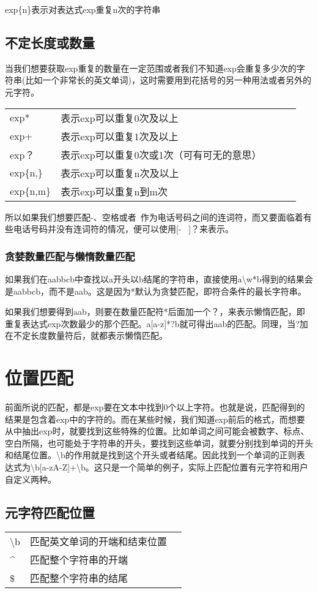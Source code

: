 \documentclass[a4papaer,utf8,12pt,draft,titlepage]{ctexart}
\begin{document}
				exp\{n\}表示对表达式exp重复n次的字符串
			\subsection{不定长度或数量}
				当我们想要获取exp重复的数量在一定范围或者我们不知道exp会重复多少次的字符串(比如一个非常长的英文单词)，这时需要用到花括号的另一种用法或者另外的元字符。
				
					\begin{table}[h]
					\begin{tabular}{lllll}
						exp* & 表示exp可以重复0次及以上&  &  &  \\
						exp+ & 表示exp可以重复1次及以上          &  &  &  \\
						exp？& 表示exp可以重复0次或1次（可有可无的意思）           &  &  &  \\
						exp\{n,\}               & 表示exp可以重复n次及以上  &  &  &\\
						exp\{n,m\} &表示exp可以重复n到m次 
					\end{tabular}
				\end{table}
				所以如果我们想要匹配-、空格或者~作为电话号码之间的连词符，而又要面临着有些电话号码并没有连词符的情况，便可以使用[- ~]？来表示。
				\subsubsection{贪婪数量匹配与懒惰数量匹配}
					如果我们在aabbcb中查找以a开头以b结尾的字符串，直接使用a\textbackslash{}w*b得到的结果会是aabbcb，而不是aab。这是因为*默认为贪婪匹配，即符合条件的最长字符串。
					
					如果我们想要得到aab，则要在数量匹配符*后面加一个？，来表示懒惰匹配，即重复表达式exp次数最少的那个匹配。a[a-z]*?b就可得出aab的匹配。同理，当?加在不定长度数量符后，就都表示懒惰匹配。
		\section{位置匹配}
			前面所说的匹配，都是exp要在文本中找到0个以上字符。也就是说，匹配得到的结果是包含着exp中的字符的。而在某些时候，我们知道exp前后的格式，而想要从中抽出exp时，就要找到这些特殊的位置。比如单词之间可能会被数字、标点、空白所隔，也可能处于字符串的开头，要找到这些单词，就要分别找到单词的开头和结尾位置。\textbackslash{}b的作用就是找到这个开头或者结尾。因此找到一个单词的正则表达式为\textbackslash{}b[a-zA-Z]+\textbackslash{}b。这只是一个简单的例子，实际上匹配位置有元字符和用户自定义两种。
			\subsection{元字符匹配位置}
				\begin{table}[h]
					\begin{tabular}{lll}
						\textbackslash{}b & 匹配英文单词的开端和结束位置\\
						\^ & 匹配整个字符串的开端\\
						\$ & 匹配整个字符串的结尾
					\end{tabular}
				\end{table}
\end{document}
